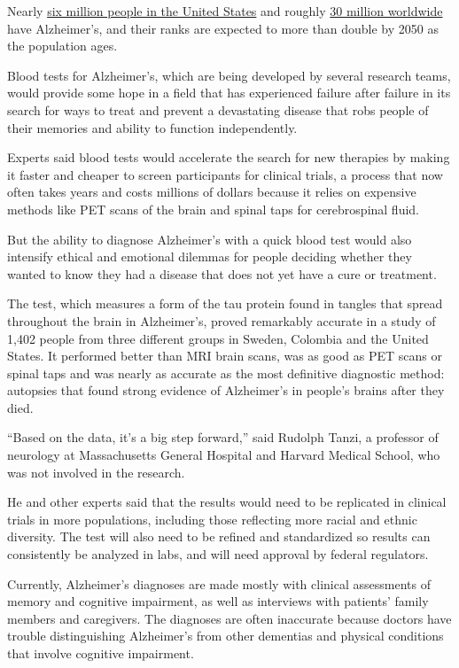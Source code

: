 Nearly
\href{https://www.alz.org/media/documents/alzheimers-facts-and-figures-2019-r.pdf}{six
million people in the United States} and roughly
\href{https://www.ncbi.nlm.nih.gov/pmc/articles/PMC6936673/}{30 million
worldwide} have Alzheimer's, and their ranks are expected to more than
double by 2050 as the population ages.

Blood tests for Alzheimer's, which are being developed by several
research teams, would provide some hope in a field that has experienced
failure after failure in its search for ways to treat and prevent a
devastating disease that robs people of their memories and ability to
function independently.

Experts said blood tests would accelerate the search for new therapies
by making it faster and cheaper to screen participants for clinical
trials, a process that now often takes years and costs millions of
dollars because it relies on expensive methods like PET scans of the
brain and spinal taps for cerebrospinal fluid.

But the ability to diagnose Alzheimer's with a quick blood test would
also intensify ethical and emotional dilemmas for people deciding
whether they wanted to know they had a disease that does not yet have a
cure or treatment.

The test, which measures a form of the tau protein found in tangles that
spread throughout the brain in Alzheimer's, proved remarkably accurate
in a study of 1,402 people from three different groups in Sweden,
Colombia and the United States. It performed better than MRI brain
scans, was as good as PET scans or spinal taps and was nearly as
accurate as the most definitive diagnostic method: autopsies that found
strong evidence of Alzheimer's in people's brains after they died.

``Based on the data, it's a big step forward,'' said Rudolph Tanzi, a
professor of neurology at Massachusetts General Hospital and Harvard
Medical School, who was not involved in the research.

He and other experts said that the results would need to be replicated
in clinical trials in more populations, including those reflecting more
racial and ethnic diversity. The test will also need to be refined and
standardized so results can consistently be analyzed in labs, and will
need approval by federal regulators.

Currently, Alzheimer's diagnoses are made mostly with clinical
assessments of memory and cognitive impairment, as well as interviews
with patients' family members and caregivers. The diagnoses are often
inaccurate because doctors have trouble distinguishing Alzheimer's from
other dementias and physical conditions that involve cognitive
impairment.

